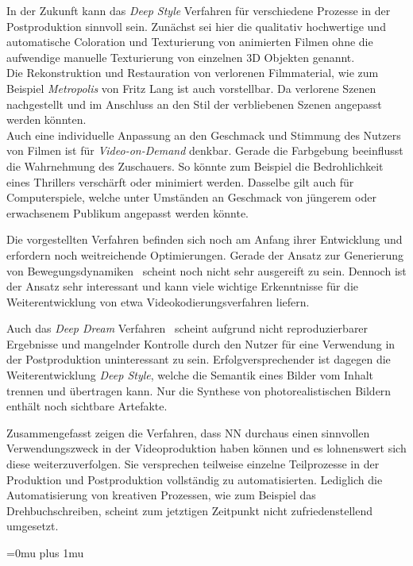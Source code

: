 \documentclass[times, 11pt,twocolumn]{article}
\begin{document}
In der Zukunft kann das \textit{Deep Style} Verfahren für verschiedene Prozesse in der Postproduktion sinnvoll sein. Zunächst sei hier die qualitativ hochwertige und automatische Coloration und Texturierung von animierten Filmen ohne die aufwendige manuelle Texturierung von einzelnen 3D Objekten genannt. \\
Die Rekonstruktion und Restauration von verlorenen Filmmaterial, wie zum Beispiel \textit{Metropolis} von Fritz Lang ist auch vorstellbar. Da verlorene Szenen nachgestellt und im Anschluss an den Stil der verbliebenen Szenen angepasst werden könnten.\\
Auch eine individuelle Anpassung an den Geschmack und Stimmung des Nutzers von Filmen ist für \textit{Video-on-Demand} denkbar. Gerade die Farbgebung beeinflusst die Wahrnehmung des Zuschauers. So könnte zum Beispiel die Bedrohlichkeit eines Thrillers verschärft oder minimiert werden. Dasselbe gilt auch für Computerspiele, welche unter Umständen an Geschmack von jüngerem oder erwachsenem Publikum angepasst werden könnte.

 \label{Fazit}
Die vorgestellten Verfahren befinden sich noch am Anfang ihrer Entwicklung und erfordern noch weitreichende Optimierungen. Gerade der Ansatz zur Generierung von Bewegungsdynamiken~\cite{VondrickPT16} scheint noch nicht sehr ausgereift zu sein. Dennoch ist der Ansatz sehr interessant und kann viele wichtige Erkenntnisse für die Weiterentwicklung von etwa Videokodierungsverfahren liefern.

Auch das \textit{Deep Dream} Verfahren~\cite{DeepDream} scheint aufgrund nicht reproduzierbarer Ergebnisse und mangelnder Kontrolle durch den Nutzer für eine Verwendung in der Postproduktion uninteressant zu sein. Erfolgversprechender ist dagegen die Weiterentwicklung \textit{Deep Style}, welche die Semantik eines Bilder vom Inhalt trennen und übertragen kann. Nur die Synthese von photorealistischen Bildern enthält noch sichtbare Artefakte.

Zusammengefasst zeigen die Verfahren, dass NN durchaus einen sinnvollen Verwendungszweck in der Videoproduktion haben können und es lohnenswert sich diese weiterzuverfolgen. Sie versprechen teilweise einzelne Teilprozesse in der Produktion und Postproduktion vollständig zu automatisierten. Lediglich die Automatisierung von kreativen Prozessen, wie zum Beispiel das Drehbuchschreiben, scheint zum jetztigen Zeitpunkt nicht zufriedenstellend umgesetzt.


\newpage
\Urlmuskip=0mu plus 1mu\relax %
 

\end{document}
